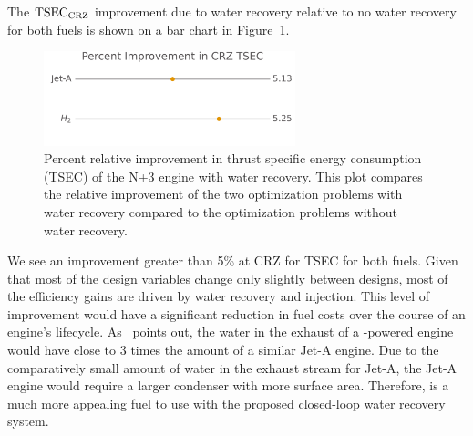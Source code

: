 \documentclass[conf]{new-aiaa}
\begin{document}
The $\rm{TSEC}_{\rm{CRZ}}$ improvement due to water recovery relative to no water recovery for both fuels is shown on a bar chart in Figure~\ref{fig:barchart}.

\begin{figure}[hbt!]
    \centering
    \includegraphics[width=0.65\textwidth]{bar_chart.pdf}
    \caption{Percent relative improvement in thrust specific energy consumption (TSEC) of the N+3 engine with water recovery.
        This plot compares the relative improvement of the two optimization problems with water recovery compared to the optimization problems without water recovery.}
    \label{fig:barchart}
\end{figure}

We see an improvement greater than 5\% at CRZ for TSEC for both fuels.
Given that most of the design variables change only slightly between designs, most of the efficiency gains are driven by water recovery and injection.
This level of improvement would have a significant reduction in fuel costs over the course of an engine's lifecycle.
As~\citeauthor{Strom2002} points out, the water in the exhaust of a -powered engine would have close to 3 times the amount of a similar Jet-A engine.
Due to the comparatively small amount of water in the exhaust stream for Jet-A, the Jet-A engine would require a larger condenser with more surface area.
Therefore,  is a much more appealing fuel to use with the proposed closed-loop water recovery system.
\end{document}
